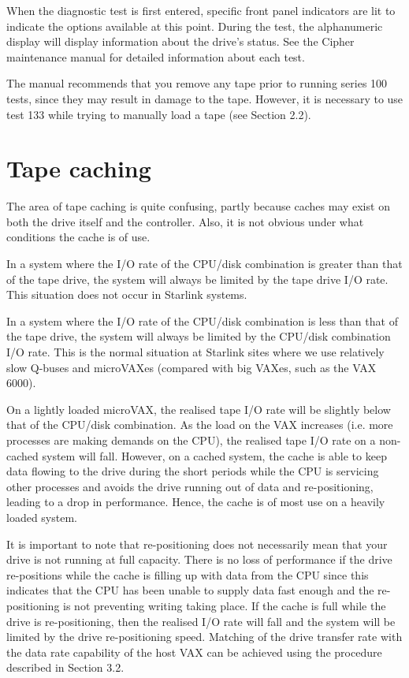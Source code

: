 When the diagnostic test is first entered, specific front panel indicators
are lit to indicate the options available at this point. During the test, the
alphanumeric display will display information about the drive's status.
See the Cipher maintenance manual for detailed information about each test.

The manual recommends that you remove any tape prior to running series 100
tests, since they may result in damage to the tape. However, it is necessary
to use test 133 while trying to manually load a tape (see Section 2.2).


\section{Tape caching}

The area of tape caching is quite confusing, partly because caches may
exist on both the drive itself and the controller. Also, it is not
obvious under what conditions the cache is of use.

In a system where the I/O rate of the CPU/disk combination is greater than
that of the tape drive, the system will always be limited by the tape drive I/O
rate. This situation does not occur in Starlink systems.

In a system where the I/O rate of the CPU/disk combination is less than
that of the tape drive, the system will always be limited by the CPU/disk
combination I/O rate. This is the normal situation at Starlink sites
where we use relatively slow Q-buses and microVAXes (compared with big
VAXes, such as the VAX 6000).

On a lightly loaded microVAX, the realised tape I/O rate will be slightly below that
of the CPU/disk combination. As the load on the VAX increases (i.e. more
processes are making demands on the CPU), the realised tape I/O rate on a non-cached
system will fall. However, on a cached system, the cache is able to keep
data flowing to the drive during the short periods while the CPU is servicing
other processes and avoids the drive running out of data and re-positioning,
leading to a drop in performance.
Hence, the cache is of most use on a heavily loaded system.

It is important to note that re-positioning does not necessarily mean that
your drive is not running at full capacity. There is no loss of performance if
the drive re-positions while the cache is filling up with data from the CPU
since this indicates that the CPU has been unable to supply data fast
enough and the re-positioning is not preventing writing taking place. If
the cache is full while the drive is re-positioning, then the realised I/O
rate will fall and the system will be limited by the drive re-positioning
speed. Matching of the drive transfer rate with the data rate capability
of the host VAX can be achieved using the procedure described in Section 3.2.

